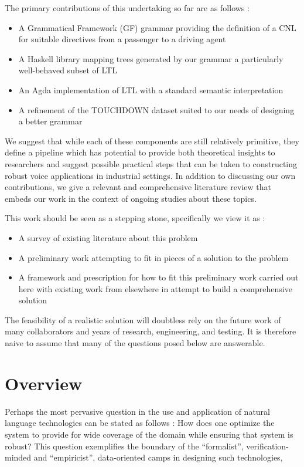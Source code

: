 \documentclass[a4paper, 11pt]{article}
\begin{document}
The primary contributions of this undertaking so far are as follows :

\begin{itemize}[noitemsep]
\item A Grammatical Framework (GF) grammar providing the definition of a CNL for
suitable directives from a passenger to a driving agent
\item A Haskell library mapping trees generated by our grammar a particularly well-behaved subset of LTL
\item An Agda implementation of LTL with a standard semantic interpretation
\item A refinement of the TOUCHDOWN dataset \cite{chen2019touchdown} suited to our needs of designing a
better grammar
\end{itemize}

We suggest that while each of these components are still relatively primitive,
they define a pipeline which has potential to provide both theoretical insights
to researchers and suggest possible practical steps that can be taken to
constructing robust voice applications in industrial settings. In addition to
discussing our own contributions, we give a relevant and comprehensive literature
review that embeds our work in the context of ongoing studies about these
topics.

This work should be seen as a stepping stone, specifically we view it as :

\begin{itemize}[noitemsep]
\item A survey of existing literature about this problem 
\item A preliminary work attempting to fit in pieces of a solution to the problem  
\item A framework and prescription for how to fit this preliminary work carried
  out here with existing work from elsewhere in attempt to build a comprehensive solution
\end{itemize}

The feasibility of a realistic solution will doubtless rely on the future work
of many collaborators and years of research, engineering, and testing. It is
therefore naive to assume that many of the questions posed below are answerable.

\section{Overview}

Perhaps the most pervasive question in the use and application of natural
language technologies can be stated as follows : How does one optimize the
system to provide for wide coverage of the domain while ensuring that system is
robust? This question exemplifies the boundary of the ``formalist'',
verification-minded and ``empiricist'', data-oriented camps in designing such
technologies,
\end{document}
